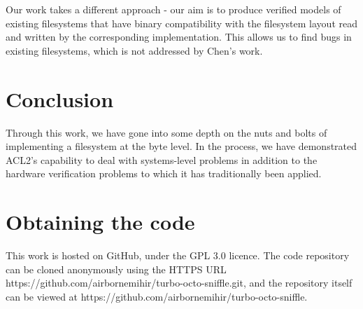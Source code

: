 \documentclass[format=sigconf,review=true]{acmart}
\begin{document}
Our work takes a different approach - our aim is to produce verified
models of existing filesystems that have binary compatibility with the
filesystem layout read and written by the corresponding
implementation. This allows us to find bugs in existing filesystems,
which is not addressed by Chen's work.

\section{Conclusion}
Through this work, we have gone into some depth on the nuts and bolts
of implementing a filesystem at the byte level. In the process, we
have demonstrated ACL2's capability to deal with systems-level
problems in addition to the hardware verification problems to which
it has traditionally been applied.

\section{Obtaining the code}
This work is hosted on GitHub, under the GPL 3.0 licence. The code
repository can be cloned anonymously using the HTTPS URL
https://github.com/airbornemihir/turbo-octo-sniffle.git, and the
repository itself can be viewed at
https://github.com/airbornemihir/turbo-octo-sniffle.



\end{document}
